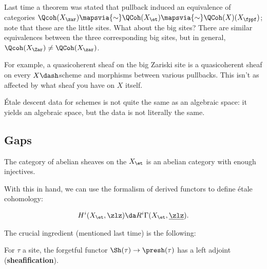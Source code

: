 \begin{remark}

Last time a theorem was stated that pullback induced an equivalence of
categories
\(\Qcoh(X_{\zar}) \mapsvia{\sim} \QCoh(X_{\et}) \mapsvia{\sim} \QCoh(X)(X_{\fppf})\);
note that these are the little sites. What about the big sites? There
are similar equivalences between the three corresponding big sites, but
in general, \(\Qcoh(X_{\Zar}) \neq \QCoh(X_{\zar})\).

For example, a quasicoherent sheaf on the big Zariski site is a
quasicoherent sheaf on every \(X\dash\)scheme and morphisms between
various pullbacks. This isn't as affected by what sheaf you have on
\(X\) itself.

\end{remark}

\begin{remark}

Étale descent data for schemes is not quite the same as an algebraic
space: it yields an algebraic space, but the data is not literally the
same.

\end{remark}

\hypertarget{gaps}{%
\subsection{Gaps}\label{gaps}}

\begin{claim}

The category of abelian sheaves on the \(X_{\et}\) is an abelian
category with enough injectives.

\end{claim}

With this in hand, we can use the formalism of derived functors to
define étale cohomology:

\begin{definition}\label{def:etale_cohomology}

\begin{align*}  
H^i(X_\et, \zlz) \da R^i \Gamma(X_\et, \underline{ \zlz} )
.\end{align*}

\end{definition}

The crucial ingredient (mentioned last time) is the following:

\begin{theorem}

For \(\tau\) a site, the forgetful functor
\(\Sh(\tau) \to \presh(\tau)\) has a left adjoint
(\textbf{sheafification}).

\end{theorem}

